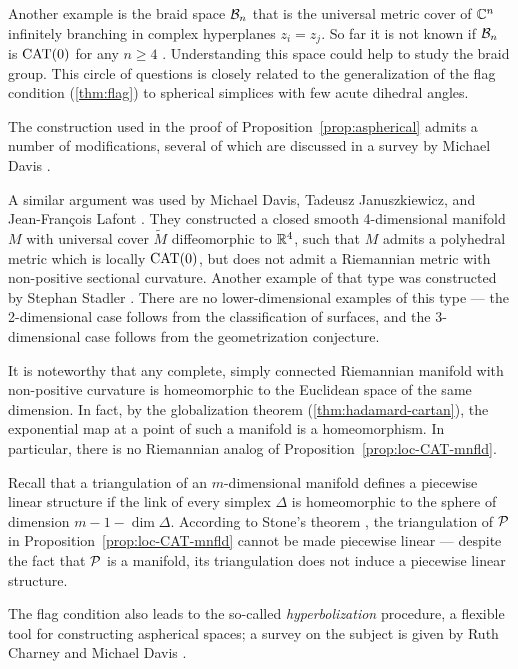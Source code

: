 Another example is the braid space $\mathcal{B}_n$ that is the universal metric cover of $\mathbb{C}^n$ infinitely branching in complex hyperplanes $z_i=z_j$.
So far it is not known if $\mathcal{B}_n$ is $\mathrm{CAT}(0)$ for any $n\ge 4$ \cite{panov-petrunin-2016}.
Understanding this space could help to study the braid group.
This circle of questions is closely related to the generalization of the flag condition (\ref{thm:flag}) to spherical simplices with few acute dihedral angles.

The construction used in the proof of Proposition~\ref{prop:aspherical} admits a number of modifications, several of which are discussed in a survey by Michael Davis \cite{davis-2001}.

A similar argument was used by Michael Davis, 
Tadeusz Ja\-nu\-szkie\-wicz,
and Jean-Fran\c{c}ois Lafont \cite{davis-januszkiewicz-lafont}.
They constructed a closed smooth 4-dimensional manifold $M$ with universal cover $\tilde M$ diffeomorphic to $\mathbb{R}^4$, such that $M$ admits a polyhedral metric which is locally $\mathrm{CAT}(0)$, but does not admit a Riemannian metric with non-positive sectional curvature.
Another example of that type was constructed by Stephan Stadler \cite{stadler}.
There are no lower-dimensional examples of this type ---
the 2-dimensional case follows from the classification of surfaces,
and 
the 3-dimensional case follows from the geometrization conjecture.

It is noteworthy that any complete, simply connected Riemannian manifold with non-positive curvature is homeomorphic to the Euclidean space of the same dimension.
In fact, by the globalization theorem
(\ref{thm:hadamard-cartan}), 
the exponential map at a point of such a manifold is a homeomorphism.
In particular, there is no Riemannian analog of Proposition~\ref{prop:loc-CAT-mnfld}.

Recall that a triangulation of an $m$-dimensional manifold defines a piecewise linear structure if the link of every simplex $\Delta$ is homeomorphic to the sphere of dimension $m-1-\dim\Delta$.
According to Stone's theorem \cite{stone, davis-januszkiewicz}, the triangulation of $\mathcal{P}$ in Proposition~\ref{prop:loc-CAT-mnfld} 
cannot be made piecewise linear --- despite the fact that $\mathcal{P}$ is a manifold, its triangulation does not induce a piecewise linear structure.

The flag condition also leads to the so-called {}\emph{hyperbolization} procedure, a flexible tool for constructing aspherical spaces;
a survey on the subject is given by Ruth Charney and Michael Davis \cite{charney-davis-1995}.

